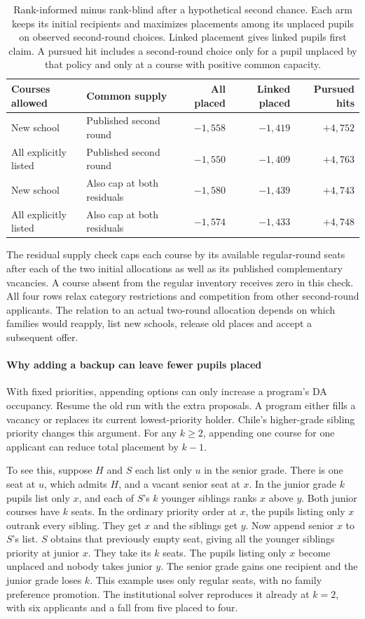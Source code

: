 \begin{table}[ht]\centering\small
\caption{Rank-informed minus rank-blind after a hypothetical second chance. Each arm keeps its initial recipients and maximizes placements among its unplaced pupils on observed second-round choices. Linked placement gives linked pupils first claim. A pursued hit includes a second-round choice only for a pupil unplaced by that policy and only at a course with positive common capacity.}\label{tab:second-chances}
\begin{tabular}{@{}llrrr@{}}\toprule
Courses allowed & Common supply & All placed & Linked placed & Pursued hits\\\midrule
New school & Published second round & $-1,558$ & $-1,419$ & $+4,752$\\
All explicitly listed & Published second round & $-1,550$ & $-1,409$ & $+4,763$\\
New school & Also cap at both residuals & $-1,580$ & $-1,439$ & $+4,743$\\
All explicitly listed & Also cap at both residuals & $-1,574$ & $-1,433$ & $+4,748$\\\bottomrule
\end{tabular}
\end{table}
The residual supply check caps each course by its available regular-round seats after each of the two initial allocations as well as its published complementary vacancies. A course absent from the regular inventory receives zero in this check. All four rows relax category restrictions and competition from other second-round applicants. The relation to an actual two-round allocation depends on which families would reapply, list new schools, release old places and accept a subsequent offer.

\paragraph{Why adding a backup can leave fewer pupils placed}
With fixed priorities, appending options can only increase a program's DA occupancy. Resume the old run with the extra proposals. A program either fills a vacancy or replaces its current lowest-priority holder. Chile's higher-grade sibling priority changes this argument. For any $k\ge 2$, appending one course for one applicant can reduce total placement by $k-1$.

To see this, suppose $H$ and $S$ each list only $u$ in the senior grade. There is one seat at $u$, which admits $H$, and a vacant senior seat at $x$. In the junior grade $k$ pupils list only $x$, and each of $S$'s $k$ younger siblings ranks $x$ above $y$. Both junior courses have $k$ seats. In the ordinary priority order at $x$, the pupils listing only $x$ outrank every sibling. They get $x$ and the siblings get $y$. Now append senior $x$ to $S$'s list. $S$ obtains that previously empty seat, giving all the younger siblings priority at junior $x$. They take its $k$ seats. The pupils listing only $x$ become unplaced and nobody takes junior $y$. The senior grade gains one recipient and the junior grade loses $k$. This example uses only regular seats, with no family preference promotion. The institutional solver reproduces it already at $k=2$, with six applicants and a fall from five placed to four.


